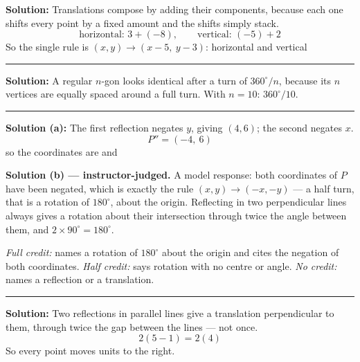 \documentclass[12pt]{article}
\begin{document}




\textbf{Solution:} Translations compose by adding their components, because each one shifts every point by a fixed amount and the shifts simply stack.
\[ \text{horizontal: } 3 + (-8), \qquad \text{vertical: } (-5) + 2 \]
So the single rule is $(x, y) \to (x - 5,\ y - 3)$: horizontal  and vertical 

\vspace{0.2cm}\noindent\rule{\linewidth}{0.2pt}


\textbf{Solution:} A regular $n$-gon looks identical after a turn of $360^\circ / n$, because its $n$ vertices are equally spaced around a full turn. With $n = 10$: $360^\circ / 10$. 

\vspace{0.2cm}\noindent\rule{\linewidth}{0.2pt}


\textbf{Solution (a):} The first reflection negates $y$, giving $(4, 6)$; the second negates $x$.
\[ P'' = (-4,\ 6) \]
so the coordinates are  and 

\textbf{Solution (b) --- instructor-judged.} A model response: both coordinates of $P$ have been negated, which is exactly the rule $(x, y) \to (-x, -y)$ --- a half turn, that is a rotation of $180^\circ$, about the origin. Reflecting in two perpendicular lines always gives a rotation about their intersection through twice the angle between them, and $2 \times 90^\circ = 180^\circ$.

\emph{Full credit:} names a rotation of $180^\circ$ about the origin and cites the negation of both coordinates. \emph{Half credit:} says rotation with no centre or angle. \emph{No credit:} names a reflection or a translation.

\vspace{0.2cm}\noindent\rule{\linewidth}{0.2pt}


\textbf{Solution:} Two reflections in parallel lines give a translation perpendicular to them, through twice the gap between the lines --- not once.
\[ 2(5 - 1) = 2(4) \]
So every point moves  units to the right.
\end{document}
